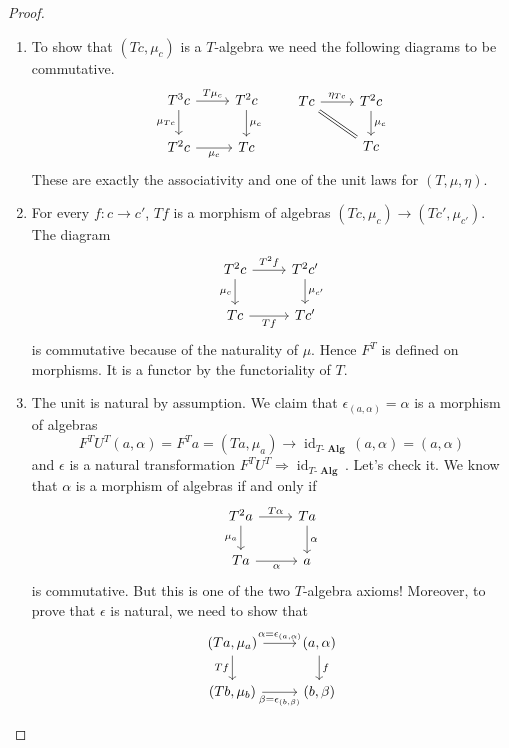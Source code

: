 \documentclass[a4paper,11pt,fullpage,oneside,openany]{amsbook}
\DeclareMathOperator{\Alg}{\mathbf{Alg}}
\DeclareMathOperator{\id}{id}
\theoremstyle{definition}
\theoremstyle{definition}
\theoremstyle{remark}
\begin{document}
\begin{proof}
	\begin{enumerate}[label=(\roman*)]
		\item To show that $(Tc, \mu_c)$ is a $T$-algebra we need the following diagrams to be commutative.
		\[
		\begin{tikzcd}
		T^3c\ar["\mu_{Tc}"', rightarrow]{d}\ar["T\mu_c", rightarrow]{r}
		& T^2c\ar["\mu_c", rightarrow]{d} \\
		T^2c\ar["\mu_c"', rightarrow]{r}
		& Tc
		\end{tikzcd}
		\quad\quad
		\begin{tikzcd}
		Tc\ar["\eta_{Tc}",rightarrow]{r}\ar[equal]{dr}
		& T^2c\ar["\mu_c", rightarrow]{d}
		\\
		& Tc
		\end{tikzcd}
		\]
		These are exactly the associativity and one of the unit laws for $(T, \mu, \eta)$.
	\item For every $f\colon c\to c'$, $Tf$ is a morphism of algebras $(Tc,\mu_c)\to(Tc', \mu_{c'})$. The diagram 
		\[
	\begin{tikzcd}
	T^2c\ar["\mu_{c}"', rightarrow]{d}\ar["T^2f", rightarrow]{r}
	& T^2c'\ar["\mu_{c'}", rightarrow]{d} \\
	Tc\ar["Tf"', rightarrow]{r}
	& Tc'
	\end{tikzcd}
		\]
	is commutative because of the naturality of $\mu$. Hence $F^T$ is defined on morphisms. It is a functor by the functoriality of $T$.
	\item The unit is natural by assumption. We claim that $\epsilon_{(a,\alpha)}=\alpha$ is a morphism of algebras $$F^TU^T(a,\alpha)=F^Ta=(Ta,\mu_a) \to \id_{T\mbox{-}\Alg}(a,\alpha)=(a,\alpha)$$ and $\epsilon$ is a natural transformation $F^TU^T\Rightarrow\id_{T\mbox{-}\Alg}$. Let's check it. We know that $\alpha$ is a morphism of algebras if and only if 
	\[	
	\begin{tikzcd}
	T^2 a\ar["\mu_{a}"']{d}\ar["T\alpha"]{r}
	& Ta\ar["\alpha"]{d} \\
	Ta\ar["\alpha"']{r}
	& a
	\end{tikzcd}
	\]
	is commutative. But this is one of the two $T$-algebra axioms! Moreover, to prove that $\epsilon$ is natural, we need to show that
		\[	
	\begin{tikzcd}
	(Ta,\mu_a) \ar["Tf"']{d}\ar["\alpha=\epsilon_{(a,\alpha)}"]{r}
	& (a,\alpha)\ar["f"]{d} \\
	(Tb,\mu_b)\ar["\beta=\epsilon_{(b,\beta)}"']{r}
	& (b,\beta)
	\end{tikzcd}
\]
\end{enumerate}
\end{proof}
\end{document}
